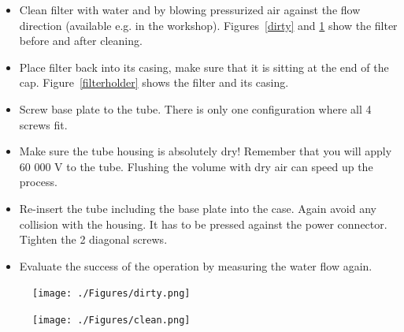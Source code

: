 \documentclass[a4paper,12pt,twoside]{article}
\begin{document}
\begin{appendices}
\begin{itemize}
\item Clean filter with water and by blowing pressurized air against the flow direction (available e.g. in the workshop). Figures~\ref{dirty} and \ref{clean} show the filter before and after cleaning.

\item Place filter back into its casing, make sure that it is sitting at the end of the cap. Figure~\ref{filterholder} shows the filter and its casing.

\item Screw base plate to the tube. There is only one configuration where all 4 screws fit.

\item Make sure the tube housing is absolutely dry! Remember that you will apply 60 000 V to the tube. Flushing the volume with dry air can speed up the process.

\item Re-insert the tube including the base plate into the case. Again avoid any collision with the housing. It has to be pressed against the power connector. Tighten the 2 diagonal screws.

\item Evaluate the success of the operation by measuring the water flow again.

\end{itemize}

\begin{figure} [h!]
\centering
\begin{minipage}{.48\textwidth}
  \centering
  \texttt{[image: ./Figures/dirty.png]}
  \label{dirty}
\end{minipage}%
\hspace{2mm}
\begin{minipage}{.48\textwidth}
  \centering
  \texttt{[image: ./Figures/clean.png]}
  \label{clean}
\end{minipage}
\end{figure}


\end{appendices}
\end{document}
